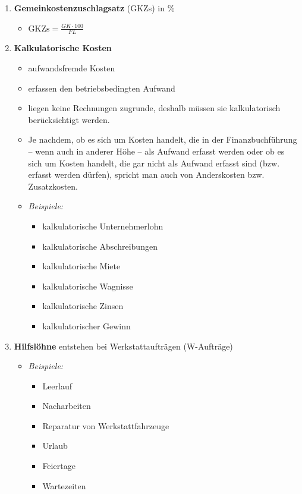 \begin{enumerate}
\item
  \textbf{Gemeinkostenzuschlagsatz} (GKZs) in \%

  \begin{itemize}
  \item
    $\boxed{\text{GKZs} = \frac{GK \cdot 100}{FL}}$
  \end{itemize}
\item
  \textbf{Kalkulatorische Kosten}

  \begin{itemize}
  \item
    aufwandsfremde Kosten
  \item
    erfassen den betriebsbedingten Aufwand
  \item
    liegen keine Rechnungen zugrunde, deshalb müssen sie kalkulatorisch
    berücksichtigt werden.
  \item
    Je nachdem, ob es sich um Kosten handelt, die in der
    Finanzbuchführung -- wenn auch in anderer Höhe -- als Aufwand
    erfasst werden oder ob es sich um Kosten handelt, die gar nicht als
    Aufwand erfasst sind (bzw. erfasst werden dürfen), spricht man auch
    von Anderskosten bzw. Zusatzkosten.
  \item
    \emph{Beispiele:}

    \begin{itemize}
    \item
      kalkulatorische Unternehmerlohn
    \item
      kalkulatorische Abschreibungen
    \item
      kalkulatorische Miete
    \item
      kalkulatorische Wagnisse
    \item
      kalkulatorische Zinsen
    \item
      kalkulatorischer Gewinn
    \end{itemize}
  \end{itemize}
\item
  \textbf{Hilfslöhne} entstehen bei Werkstattaufträgen (W-Aufträge)

  \begin{itemize}
  \item
    \emph{Beispiele:}

    \begin{itemize}
    \item
      Leerlauf
    \item
      Nacharbeiten
    \item
      Reparatur von Werkstattfahrzeuge
    \item
      Urlaub
    \item
      Feiertage
    \item
      Wartezeiten
    \end{itemize}
  \end{itemize}
\end{enumerate}

